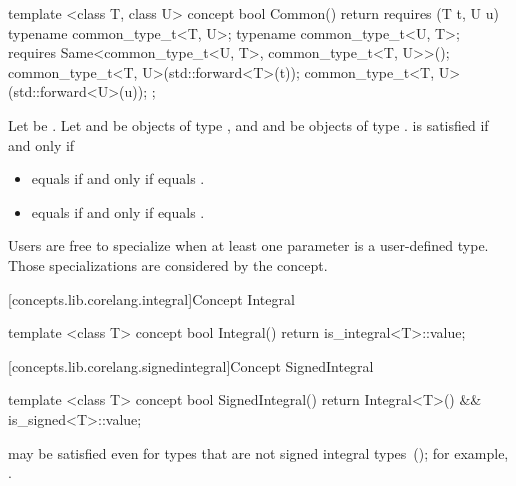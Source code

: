 \begin{addedblock}
%
\begin{itemdecl}
template <class T, class U>
concept bool Common() {
  return requires (T t, U u) {
    typename common_type_t<T, U>;
    typename common_type_t<U, T>;
    requires Same<common_type_t<U, T>, common_type_t<T, U>>();
    common_type_t<T, U>(std::forward<T>(t));
    common_type_t<T, U>(std::forward<U>(u));
  };
}
\end{itemdecl}

\begin{itemdescr}
\pnum
Let  be . Let  and  be objects
of type , and  and  be objects of type .
 is satisfied if and only if
\begin{itemize}
\item {} equals  if and only if  equals .
\item {} equals  if and only if  equals .
\end{itemize}

\pnum
\enternote Users are free to specialize  when at least one parameter is a
user-defined type. Those specializations are considered by the  concept.\exitnote

\end{itemdescr}

[concepts.lib.corelang.integral]{Concept Integral}

%
\begin{itemdecl}
template <class T>
concept bool Integral() {
  return is_integral<T>::value;
}
\end{itemdecl}

[concepts.lib.corelang.signedintegral]{Concept SignedIntegral}

%
\begin{itemdecl}
template <class T>
concept bool SignedIntegral() {
  return Integral<T>() && is_signed<T>::value;
}
\end{itemdecl}

\begin{itemdescr}
\pnum
\enternote {} may be satisfied even for
types that are not signed integral types~();
for example, .
\exitnote
\end{itemdescr}


\end{addedblock}
